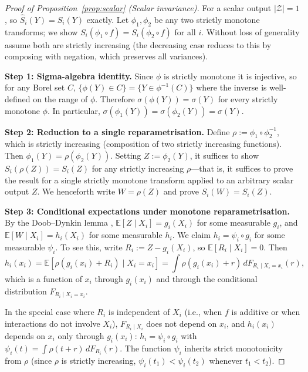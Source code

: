 \documentclass[11pt,onecolumn]{article}
\begin{document}
\begin{proof}[Proof of Proposition~\ref{prop:scalar} (Scalar invariance)]
For a scalar output $|\mathcal{Z}|=1$, so $\hat{S}_i(Y) = S_i(Y)$ exactly.
Let $\phi_1, \phi_2$ be any two strictly monotone transforms; we show
$S_i(\phi_1 \circ f) = S_i(\phi_2 \circ f)$ for all $i$.
Without loss of generality assume both are strictly increasing (the
decreasing case reduces to this by composing with negation, which preserves
all variances).

\textbf{Step 1: Sigma-algebra identity.}\quad
Since $\phi$ is strictly monotone it is injective, so for any Borel set $C$,
$\{\phi(Y) \in C\} = \{Y \in \phi^{-1}(C)\}$ where the inverse is
well-defined on the range of $\phi$.  Therefore $\sigma(\phi(Y)) = \sigma(Y)$
for every strictly monotone $\phi$.  In particular,
$\sigma(\phi_1(Y)) = \sigma(\phi_2(Y)) = \sigma(Y)$.

\textbf{Step 2: Reduction to a single reparametrisation.}\quad
Define $\rho := \phi_1 \circ \phi_2^{-1}$, which is strictly increasing
(composition of two strictly increasing functions).  Then
$\phi_1(Y) = \rho(\phi_2(Y))$.  Setting $Z := \phi_2(Y)$, it suffices
to show $S_i(\rho(Z)) = S_i(Z)$ for any strictly increasing $\rho$---that is,
it suffices to prove the result for a single strictly monotone transform
applied to an arbitrary scalar output $Z$.  We henceforth write $W = \rho(Z)$
and prove $S_i(W) = S_i(Z)$.

\textbf{Step 3: Conditional expectations under monotone reparametrisation.}\quad
By the Doob--Dynkin lemma \citep{Kallenberg2002}, $\mathbb{E}[Z \mid X_i] = g_i(X_i)$
for some measurable $g_i$, and $\mathbb{E}[W \mid X_i] = h_i(X_i)$ for some
measurable $h_i$.
We claim $h_i = \psi_i \circ g_i$ for some measurable $\psi_i$.
To see this, write $R_i := Z - g_i(X_i)$, so $\mathbb{E}[R_i \mid X_i] = 0$.
Then
\[
  h_i(x_i) = \mathbb{E}[\rho(g_i(x_i) + R_i) \mid X_i = x_i]
            = \int \rho(g_i(x_i) + r)\,dF_{R_i \mid X_i = x_i}(r),
\]
which is a function of $x_i$ through $g_i(x_i)$ and through the conditional
distribution $F_{R_i \mid X_i = x_i}$.

In the special case where $R_i$ is independent of $X_i$ (i.e., when $f$
is additive or when interactions do not involve $X_i$), $F_{R_i \mid X_i}$
does not depend on $x_i$, and $h_i(x_i)$ depends on $x_i$ only through
$g_i(x_i)$: $h_i = \psi_i \circ g_i$ with $\psi_i(t) = \int \rho(t+r)\,dF_{R_i}(r)$.
The function $\psi_i$ inherits strict monotonicity from $\rho$ (since
$\rho$ is strictly increasing, $\psi_i(t_1) < \psi_i(t_2)$ whenever
$t_1 < t_2$).


\end{proof}
\end{document}
